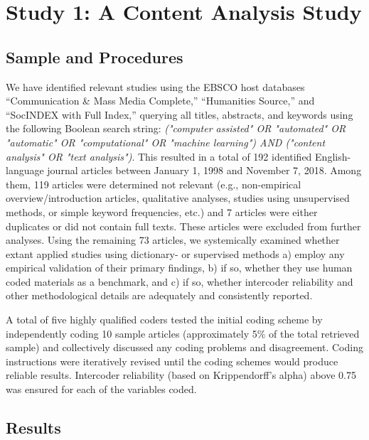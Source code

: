 \documentclass[man, floatsintext, 12pt, a4paper, noextraspace]{apa6}
\begin{document}
\section{Study 1: A Content Analysis Study}

\subsection{Sample and Procedures}

    We have identified relevant studies using the EBSCO host databases “Communication \& Mass Media Complete,” “Humanities Source,” and “SocINDEX with Full Index,” querying all titles, abstracts, and keywords using the following Boolean search string: \textit{("computer assisted" OR "automated" OR "automatic" OR "computational" OR "machine learning") AND ("content analysis" OR "text analysis")}. This resulted in a total of 192 identified English-language journal articles between January 1, 1998 and November 7, 2018. Among them, 119 articles were determined not relevant (e.g., non-empirical overview/introduction articles, qualitative analyses, studies using unsupervised methods, or simple keyword frequencies, etc.) and 7 articles were either duplicates or did not contain full texts. These articles were excluded from further analyses. Using the remaining 73 articles, we systemically examined whether extant applied studies using dictionary- or supervised methods a) employ any empirical validation of their primary findings, b) if so, whether they use human coded materials as a benchmark, and c) if so, whether intercoder reliability and other methodological details are adequately and consistently reported. 
    
    A total of five highly qualified coders tested the initial coding scheme by independently coding 10 sample articles (approximately 5\% of the total retrieved sample) and collectively discussed any coding problems and disagreement. Coding instructions were iteratively revised until the coding schemes would produce reliable results. Intercoder reliability (based on Krippendorff’s alpha) above 0.75 was ensured for each of the variables coded.   
    
\subsection{Results}
\end{document}
